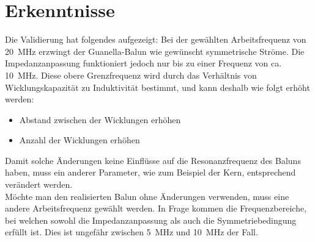 \section{Erkenntnisse}
Die Validierung hat folgendes aufgezeigt: Bei der gewählten Arbeitsfrequenz von \SI{20}{MHz} erzwingt der Guanella-Balun wie gewünscht symmetrische Ströme. Die Impedanzanpassung funktioniert jedoch nur bis zu einer Frequenz von ca. \SI{10}{MHz}. Diese obere Grenzfrequenz wird durch das Verhältnis von Wicklungskapazität zu Induktivität bestimmt, und kann deshalb wie folgt erhöht werden:
\begin{itemize}
	\item Abstand zwischen der Wicklungen erhöhen
	\item Anzahl der Wicklungen erhöhen
\end{itemize}

Damit solche Änderungen keine Einflüsse auf die Resonanzfrequenz des Baluns haben, muss ein anderer Parameter, wie zum Beispiel der Kern, entsprechend verändert werden.\\
\vspace{1cm}
Möchte man den realisierten Balun ohne Änderungen verwenden, muss eine andere Arbeitsfrequenz gewählt werden. In Frage kommen die Frequenzbereiche, bei welchen sowohl die Impedanzanpassung als auch die Symmetriebedingung erfüllt ist. Dies ist ungefähr zwischen \SI{5}{MHz} und \SI{10}{MHz} der Fall. 
\vspace{1cm}

